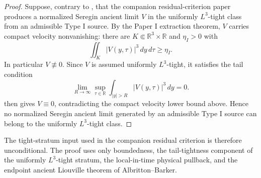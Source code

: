 \documentclass[11pt]{amsart}
\theoremstyle{plain}
\theoremstyle{definition}
\theoremstyle{remark}
\numberwithin{equation}{section}
\newcommand{\R}{\mathbb R}
\begin{document}
\begin{proof}
Suppose, contrary to , that the companion
residual-criterion paper produces a normalized Seregin ancient limit \(V\) in
the uniformly \(L^3\)-tight class from an admissible Type I source.  By the
Paper I extraction theorem, \(V\) carries compact velocity nonvanishing:
there are \(K\Subset\mathbb R^3\times\mathbb R\) and \(\eta_I>0\) with
\[
   \iint_K |V(y,\tau)|^3\,dy\,d\tau\ge\eta_I .
\]
In particular \(V\not\equiv0\).  Since \(V\) is assumed uniformly
\(L^3\)-tight, it satisfies the tail condition
\[
   \lim_{R\to\infty}
   \sup_{\tau\in\R}\int_{|y|>R}|V(y,\tau)|^3\,dy=0 .
\]
 then gives \(V\equiv0\), contradicting the compact
velocity lower bound above.  Hence no normalized Seregin ancient limit
generated by an admissible Type I source can belong to the uniformly
\(L^3\)-tight class.
\end{proof}

The tight-stratum input used in the companion residual criterion is therefore
unconditional.  The proof uses only boundedness, the tail-tightness component
of the uniformly \(L^3\)-tight stratum, the local-in-time physical pullback,
and the endpoint ancient Liouville theorem of Albritton--Barker.
\end{document}
